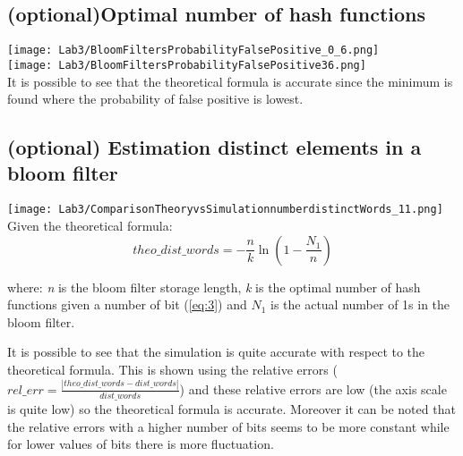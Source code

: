 \documentclass[twocolumn,letterpaper]{report}
\begin{document}
{				\subsection{(optional)Optimal number of hash functions}
				\texttt{[image: Lab3/BloomFiltersProbabilityFalsePositive\_0\_6.png]} \\
						\texttt{[image: Lab3/BloomFiltersProbabilityFalsePositive36.png]} \\
				It is possible to see that the theoretical formula is accurate since the minimum is found where the probability of false positive is lowest.
				
				
				\subsection{(optional) Estimation distinct elements in a bloom filter}
				\texttt{[image: Lab3/ComparisonTheoryvsSimulationnumberdistinctWords\_11.png]} \\
				Given the theoretical formula: 
				\[ theo\_dist\_words = - \frac{n}{k} \ln \left( 1 - \frac{N_1}{n} \right) \]
				\begin{center}
				where: \emph{n} is the bloom filter storage length, \emph{k} is the optimal number of hash functions given a number of bit  (\ref{eq:3}) and $N_1$ is the actual number of 1s in the bloom filter. 
				\end{center}
				It is possible to see that the simulation is quite accurate with respect to the theoretical formula. This is shown using the relative errors ($ rel\_err=\frac{|theo\_dist\_words-dist\_words|}{dist\_words} $) and these relative errors are low (the axis scale is quite low) so the theoretical formula is accurate. Moreover it can be noted that the relative errors with a higher number of bits seems to be more constant while for lower values of bits there is more fluctuation.
				
} \fi
\end{document}
